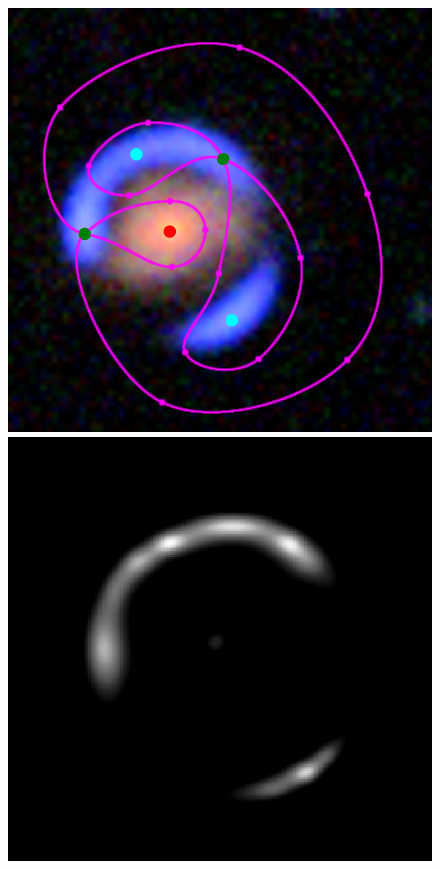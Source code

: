 \documentclass[usenatbib]{mn2e}
\newlength{\myplotswidth}
\begin{document}
\begin{figure}
  \centering

  \includegraphics[width=\myplotswidth]{fig/006919_input}
  \includegraphics[width=\myplotswidth]{fig/006919_arr_time_ipol} \\

\end{figure}
\end{document}
